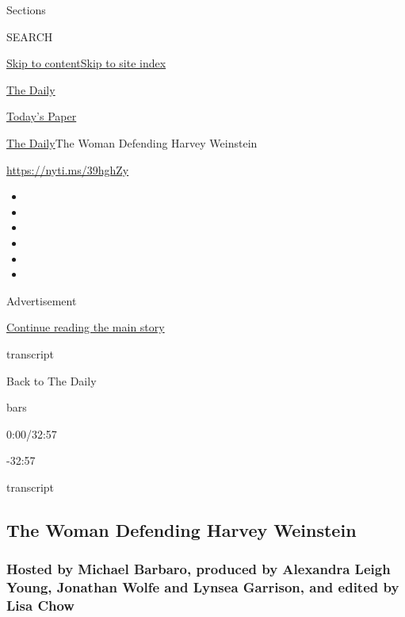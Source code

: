 Sections

SEARCH

\protect\hyperlink{site-content}{Skip to
content}\protect\hyperlink{site-index}{Skip to site index}

\href{https://www.nytimes.com/podcasts/the-daily}{The Daily}

\href{https://myaccount.nytimes.com/auth/login?response_type=cookie\&client_id=vi}{}

\href{https://www.nytimes.com/section/todayspaper}{Today's Paper}

\href{/podcasts/the-daily}{The Daily}\textbar{}The Woman Defending
Harvey Weinstein

\href{https://nyti.ms/39hghZy}{https://nyti.ms/39hghZy}

\begin{itemize}
\item
\item
\item
\item
\item
\item
\end{itemize}

Advertisement

\protect\hyperlink{after-top}{Continue reading the main story}

transcript

Back to The Daily

bars

0:00/32:57

-32:57

transcript

\hypertarget{the-woman-defending-harvey-weinstein}{%
\subsection{The Woman Defending Harvey
Weinstein}\label{the-woman-defending-harvey-weinstein}}

\hypertarget{hosted-by-michael-barbaro-produced-by-alexandra-leigh-young-jonathan-wolfe-and-lynsea-garrison-and-edited-by-lisa-chow}{%
\subsubsection{Hosted by Michael Barbaro, produced by Alexandra Leigh
Young, Jonathan Wolfe and Lynsea Garrison, and edited by Lisa
Chow}\label{hosted-by-michael-barbaro-produced-by-alexandra-leigh-young-jonathan-wolfe-and-lynsea-garrison-and-edited-by-lisa-chow}}

